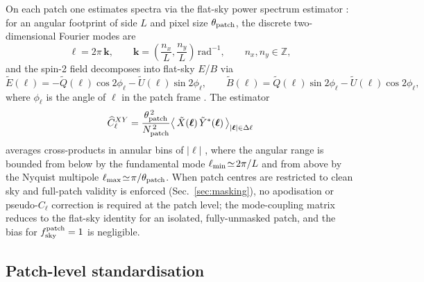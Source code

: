 \documentclass[11pt]{article}
\theoremstyle{definition}
\begin{document}
On each patch one estimates spectra via the flat-sky power spectrum estimator \cite{seljak1997,sullivan2024methods}: for an angular footprint of side \(L\) and pixel size $\theta_{\rm patch}$, the discrete two-dimensional Fourier modes are
\begin{equation}
  \bm{\ell} = 2\pi\,\bm{k},
  \qquad
  \bm{k} = \left(\frac{n_x}{L},\frac{n_y}{L}\right)\,\mathrm{rad}^{-1},
  \qquad n_x,n_y\in\mathbb{Z},
\end{equation}
and the spin-2 field decomposes into flat-sky $E$/$B$ via
\begin{equation}
  \tilde E(\bm{\ell}) = -\tilde Q(\bm{\ell})\cos 2\phi_\ell - \tilde U(\bm{\ell})\sin 2\phi_\ell,
  \qquad
  \tilde B(\bm{\ell}) =  \tilde Q(\bm{\ell})\sin 2\phi_\ell - \tilde U(\bm{\ell})\cos 2\phi_\ell,
\end{equation}
where \(\phi_\ell\) is the angle of \(\bm{\ell}\) in the patch frame \cite{kamionkowski1997,seljak1997}. The estimator
\begin{equation}
  \widehat C_\ell^{XY}
  = \frac{\theta_{\rm patch}^{\,2}}{N_{\rm patch}^{\,2}}
    \big\langle\, \tilde X(\bm{\ell})\,\tilde Y^\ast(\bm{\ell})\,\big\rangle_{|\bm{\ell}|\in\Delta\ell}
  \label{eq:flatsky_estimator}
\end{equation}
averages cross-products in annular bins of \(|\bm{\ell}|\) \cite{sullivan2024methods}, where the angular range is bounded from below by the fundamental mode $\ell_{\rm min}\!\simeq\!2\pi/L$ and from above by the Nyquist multipole $\ell_{\rm max}\!\simeq\!\pi/\theta_{\rm patch}$. When patch centres are restricted to clean sky and full-patch validity is enforced (Sec.~\ref{sec:masking}), no apodisation or pseudo-\(C_\ell\) correction is required at the patch level; the mode-coupling matrix reduces to the flat-sky identity for an isolated, fully-unmasked patch, and the bias for $f_{\rm sky}^{\rm patch}=1$ is negligible.

\subsection{Patch-level standardisation}
\label{sec:normalisation}
\end{document}
